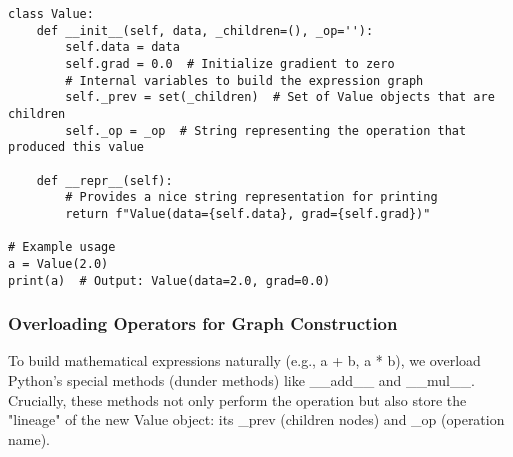 \begin{lstlisting}[caption={Initial Value Class}] 
class Value: 
    def __init__(self, data, _children=(), _op=''): 
        self.data = data 
        self.grad = 0.0  # Initialize gradient to zero 
        # Internal variables to build the expression graph 
        self._prev = set(_children)  # Set of Value objects that are children 
        self._op = _op  # String representing the operation that produced this value

    def __repr__(self):
        # Provides a nice string representation for printing
        return f"Value(data={self.data}, grad={self.grad})"

# Example usage
a = Value(2.0) 
print(a)  # Output: Value(data=2.0, grad=0.0) 
\end{lstlisting}

\subsubsection{Overloading Operators for Graph Construction} 
To build mathematical expressions naturally (e.g., a + b, a * b), we overload Python's special methods (dunder methods) like \_\_add\_\_ and \_\_mul\_\_. Crucially, these methods not only perform the operation but also store the "lineage" of the new Value object: its \_prev (children nodes) and \_op (operation name).

